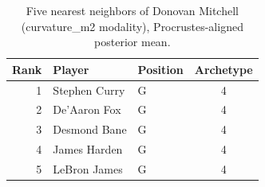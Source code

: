 \begin{table}[htbp]
  \centering\small
  \begin{tabular}{rllc}
    \toprule
    Rank & Player & Position & Archetype \\
    \midrule
    1 & Stephen Curry & G & 4 \\
    2 & De'Aaron Fox & G & 4 \\
    3 & Desmond Bane & G & 4 \\
    4 & James Harden & G & 4 \\
    5 & LeBron James & G & 4 \\
    \bottomrule
  \end{tabular}
  \caption{Five nearest neighbors of Donovan Mitchell (curvature_m2 modality), Procrustes-aligned posterior mean.}
  \label{tab:Donovan_Mitchell_neighbors_curvature_m2}
\end{table}

